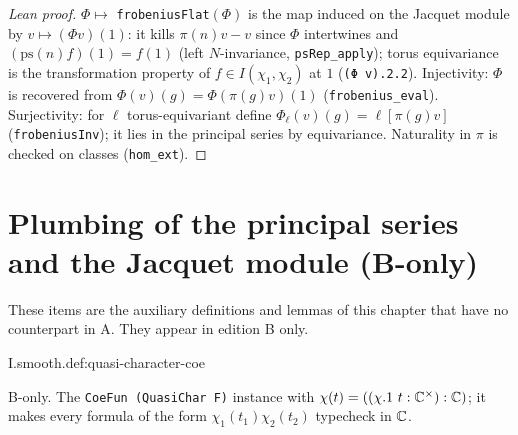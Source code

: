 \begin{proof}[Lean proof]
$\Phi\mapsto$ \texttt{frobeniusFlat}$(\Phi)$ is the map induced on the Jacquet module by $v\mapsto(\Phi v)(1)$: it kills $\pi(n)v-v$ since $\Phi$ intertwines and $(\mathrm{ps}(n)f)(1)=f(1)$ (left $N$-invariance, \texttt{psRep\_apply}); torus equivariance is the transformation property of $f\in I(\chi_1,\chi_2)$ at $1$ (\texttt{(Φ v).2.2}). Injectivity: $\Phi$ is recovered from $\Phi(v)(g)=\Phi(\pi(g)v)(1)$ (\texttt{frobenius\_eval}). Surjectivity: for $\ell$ torus-equivariant define $\Phi_\ell(v)(g)=\ell[\pi(g)v]$ (\texttt{frobeniusInv}); it lies in the principal series by equivariance. Naturality in $\pi$ is checked on classes (\texttt{hom\_ext}).
\end{proof}

\section{Plumbing of the principal series and the Jacquet module (B-only)}

\noindent These items are the auxiliary definitions and lemmas of this chapter that have no counterpart in A. They appear in edition B only.

\begin{definition}
\bonly
{}
\end{definition}
\begin{tfformal}{I.smooth.def:quasi-character-coe}
\begin{tffidelity}
B-only. The \texttt{CoeFun (QuasiChar F)} instance with $\chi(t)=((\chi.1\ t:\mathbb{C}^{\times}):\mathbb{C})$; it makes every formula of the form $\chi_1(t_1)\chi_2(t_2)$ typecheck in $\mathbb{C}$.
\end{tffidelity}
\end{tfformal}

